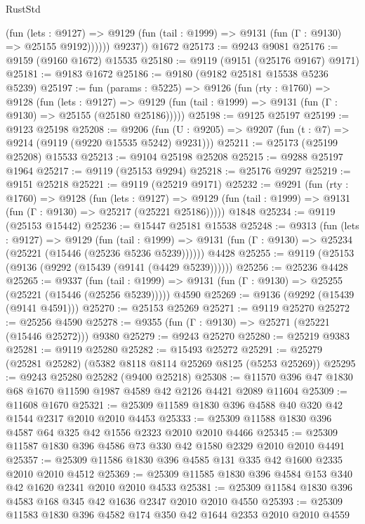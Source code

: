 \begin{lexlean}{RustStd}
\begin{coremodule}
              (fun (lets : @9127) =>
              @9129 (fun (tail : @1999) => @9131 (fun (Γ : @9130) => @25155 @9192))))))
        @9237))
    @1672
@25173 := @9243 @9081
@25176 := @9159 (@9160 @1672) @15535
@25180 := @9119 (@9151 (@25176 @9167) @9171)
@25181 := @9183 @1672
@25186 := @9180 (@9182 @25181 @15538 @5236 @5239)
@25197 := fun (params : @5225) =>
  @9126
    (fun (rty : @1760) =>
    @9128
      (fun (lets : @9127) =>
      @9129 (fun (tail : @1999) => @9131 (fun (Γ : @9130) => @25155 (@25180 @25186)))))
@25198 := @9125 @25197
@25199 := @9123 @25198
@25208 := @9206
    (fun (U : @9205) => @9207 (fun (t : @7) => @9214 (@9119 (@9220 @15535 @5242) @9231)))
@25211 := @25173 (@25199 @25208) @15533
@25213 := @9104 @25198 @25208
@25215 := @9288 @25197 @1964
@25217 := @9119 (@25153 @9294)
@25218 := @25176 @9297
@25219 := @9151 @25218
@25221 := @9119 (@25219 @9171)
@25232 := @9291
    (fun (rty : @1760) =>
    @9128
      (fun (lets : @9127) =>
      @9129 (fun (tail : @1999) => @9131 (fun (Γ : @9130) => @25217 (@25221 @25186)))))
    @1848
@25234 := @9119 (@25153 @15442)
@25236 := @15447 @25181 @15538
@25248 := @9313
    (fun (lets : @9127) =>
    @9129
      (fun (tail : @1999) =>
      @9131 (fun (Γ : @9130) => @25234 (@25221 (@15446 (@25236 @5236 @5239))))))
    @4428
@25255 := @9119 (@25153 (@9136 (@9292 (@15439 (@9141 (@4429 @5239))))))
@25256 := @25236 @4428
@25265 := @9337
    (fun (tail : @1999) => @9131 (fun (Γ : @9130) => @25255 (@25221 (@15446 (@25256 @5239)))))
    @4590
@25269 := @9136 (@9292 (@15439 (@9141 @4591)))
@25270 := @25153 @25269
@25271 := @9119 @25270
@25272 := @25256 @4590
@25278 := @9355 (fun (Γ : @9130) => @25271 (@25221 (@15446 @25272))) @9380
@25279 := @9243 @25270
@25280 := @25219 @9383
@25281 := @9119 @25280
@25282 := @15493 @25272
@25291 := @25279 (@25281 @25282) (@5382 @8118 @8114 @25269 @8125 (@5253 @25269))
@25295 := @9243 @25280 @25282 (@9400 @25218)
@25308 := @11570 @396 @47 @1830 @68 @1670 @11590 @1987 @4589 @42 @2126 @4421 @2089 @11604
@25309 := @11608 @1670
@25321 := @25309 @11589 @1830 @396 @4588 @40 @320 @42 @1544 @2317 @2010 @2010 @4453
@25333 := @25309 @11588 @1830 @396 @4587 @64 @325 @42 @1556 @2323 @2010 @2010 @4466
@25345 := @25309 @11587 @1830 @396 @4586 @73 @330 @42 @1580 @2329 @2010 @2010 @4491
@25357 := @25309 @11586 @1830 @396 @4585 @131 @335 @42 @1600 @2335 @2010 @2010 @4512
@25369 := @25309 @11585 @1830 @396 @4584 @153 @340 @42 @1620 @2341 @2010 @2010 @4533
@25381 := @25309 @11584 @1830 @396 @4583 @168 @345 @42 @1636 @2347 @2010 @2010 @4550
@25393 := @25309 @11583 @1830 @396 @4582 @174 @350 @42 @1644 @2353 @2010 @2010 @4559

\end{coremodule}
\end{lexlean}
